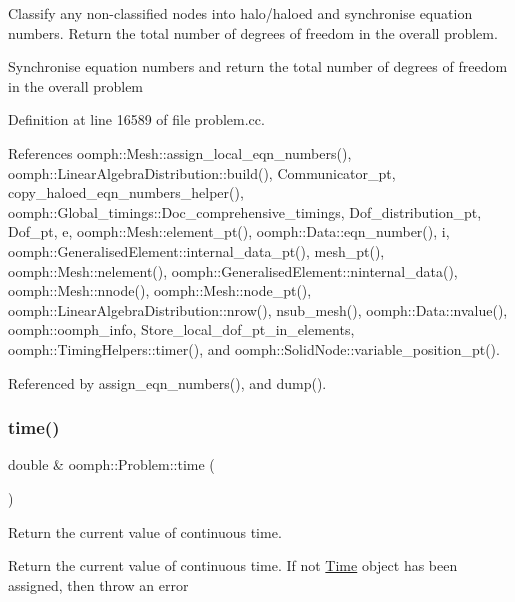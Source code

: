 Classify any non-\/classified nodes into halo/haloed and synchronise equation numbers. Return the total number of degrees of freedom in the overall problem. 

Synchronise equation numbers and return the total number of degrees of freedom in the overall problem 

Definition at line 16589 of file problem.\+cc.



References oomph\+::\+Mesh\+::assign\+\_\+local\+\_\+eqn\+\_\+numbers(), oomph\+::\+Linear\+Algebra\+Distribution\+::build(), Communicator\+\_\+pt, copy\+\_\+haloed\+\_\+eqn\+\_\+numbers\+\_\+helper(), oomph\+::\+Global\+\_\+timings\+::\+Doc\+\_\+comprehensive\+\_\+timings, Dof\+\_\+distribution\+\_\+pt, Dof\+\_\+pt, e, oomph\+::\+Mesh\+::element\+\_\+pt(), oomph\+::\+Data\+::eqn\+\_\+number(), i, oomph\+::\+Generalised\+Element\+::internal\+\_\+data\+\_\+pt(), mesh\+\_\+pt(), oomph\+::\+Mesh\+::nelement(), oomph\+::\+Generalised\+Element\+::ninternal\+\_\+data(), oomph\+::\+Mesh\+::nnode(), oomph\+::\+Mesh\+::node\+\_\+pt(), oomph\+::\+Linear\+Algebra\+Distribution\+::nrow(), nsub\+\_\+mesh(), oomph\+::\+Data\+::nvalue(), oomph\+::oomph\+\_\+info, Store\+\_\+local\+\_\+dof\+\_\+pt\+\_\+in\+\_\+elements, oomph\+::\+Timing\+Helpers\+::timer(), and oomph\+::\+Solid\+Node\+::variable\+\_\+position\+\_\+pt().



Referenced by assign\+\_\+eqn\+\_\+numbers(), and dump().

\mbox{\label{classoomph_1_1Problem_acd8c357349d20a28af70b2b7ea7f488d}} 
\subsubsection{\texorpdfstring{time()}{time()}\hspace{0.1cm}{\footnotesize\ttfamily [1/2]}}
{\footnotesize\ttfamily double \& oomph\+::\+Problem\+::time (\begin{DoxyParamCaption}{ }\end{DoxyParamCaption})\hspace{0.3cm}{\ttfamily [virtual]}}



Return the current value of continuous time. 

Return the current value of continuous time. If not \hyperlink{classoomph_1_1Time}{Time} object has been assigned, then throw an error 

